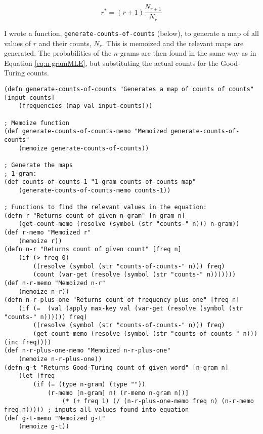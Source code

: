 \begin{equation}
r^{*}=(r+1)\frac{N_{r+1}}{N_{r}}
\label{eq:goodTuring}
\end{equation}


I wrote a function, \lstinline!generate-counts-of-counts! (below), to generate a map of all values of $r$ and their counts, $N_{r}$. This is memoized and the relevant maps are generated. The probabilities of the $n$-grams are then found in the same way as in Equation \ref{eq:n-gramMLE}, but substituting the actual counts for the Good-Turing counts.

\begin{lstlisting}
(defn generate-counts-of-counts "Generates a map of counts of counts" [input-counts] 
	(frequencies (map val input-counts))) 

; Memoize function
(def generate-counts-of-counts-memo "Memoized generate-counts-of-counts" 
	(memoize generate-counts-of-counts))

; Generate the maps
; 1-gram:
(def counts-of-counts-1 "1-gram counts-of-counts map" 
	(generate-counts-of-counts-memo counts-1))

; Functions to find the relevant values in the equation:
(defn r "Returns count of given n-gram" [n-gram n] 
	(get-count-memo (resolve (symbol (str "counts-" n))) n-gram)) 
(def r-memo "Memoized r" 
	(memoize r))
(defn n-r "Returns count of given count" [freq n] 
	(if (> freq 0) 
		((resolve (symbol (str "counts-of-counts-" n))) freq)
		(count (var-get (resolve (symbol (str "counts-" n)))))))
(def n-r-memo "Memoized n-r" 
	(memoize n-r))
(defn n-r-plus-one "Returns count of frequency plus one" [freq n] 
	(if (=  (val (apply max-key val (var-get (resolve (symbol (str "counts-" n)))))) freq)
		((resolve (symbol (str "counts-of-counts-" n))) freq) 
		(get-count-memo (resolve (symbol (str "counts-of-counts-" n))) (inc freq))))
(def n-r-plus-one-memo "Memoized n-r-plus-one" 
	(memoize n-r-plus-one))
(defn g-t "Returns Good-Turing count of given word" [n-gram n] 
	(let [freq 
		(if (= (type n-gram) (type "")) 
			(r-memo [n-gram] n) (r-memo n-gram n))]
				(* (+ freq 1) (/ (n-r-plus-one-memo freq n) (n-r-memo freq n))))) ; inputs all values found into equation
(def g-t-memo "Memoized g-t" 
	(memoize g-t))
\end{lstlisting}


